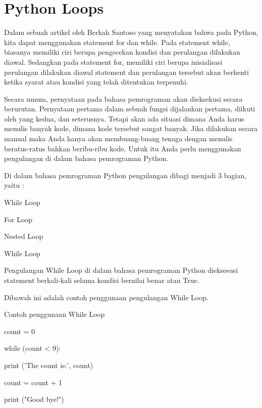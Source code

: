 
\section {Python Loops}

Dalam sebuah artikel oleh Berkah Santoso yang menyatakan bahwa pada Python, kita dapat menggunakan statement for dan while. Pada statement while,  biasanya memiliki ciri berupa pengecekan kondisi dan perulangan dilakukan diawal. Sedangkan pada statement for, memiliki ciri berupa inisialisasi perulangan dilakukan diawal statement dan perulangan tersebut akan berhenti ketika syarat atau kondisi yang telah ditentukan terpenuhi. \cite{santoso2009bahasa}

Secara umum, pernyataan pada bahasa pemrograman akan dieksekusi secara berurutan. Pernyataan pertama dalam sebuah fungsi dijalankan pertama, diikuti oleh yang kedua, dan seterusnya. Tetapi akan ada situasi dimana Anda harus menulis banyak kode, dimana kode tersebut sangat banyak. Jika dilakukan secara manual maka Anda hanya akan membuang-buang tenaga dengan menulis beratus-ratus bahkan beribu-ribu kode. Untuk itu Anda perlu menggunakan pengulangan di dalam bahasa pemrograman Python. 
 


Di dalam bahasa pemrograman Python pengulangan dibagi menjadi 3 bagian, yaitu : 
 
While Loop 
 
For Loop 
 
Nested Loop 
 



 
While Loop 
 
Pengulangan While Loop di dalam bahasa pemrograman Python dieksesusi statement berkali-kali selama kondisi bernilai benar atau True. 
 


Dibawah ini adalah contoh penggunaan pengulangan While Loop. 
 


 
Contoh penggunaan While Loop 
 


count = 0 
 

while (count < 9): 
 

        print ('The count is:', count) 
 

        count = count + 1 
 


print ("Good bye!") 
 




